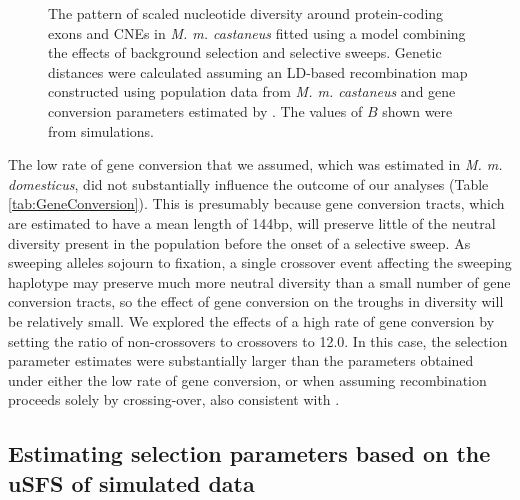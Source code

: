 {\linespread{1}
\begin{figure}[h!]
   \centering      
   \noindent{}
 \caption{The pattern of scaled nucleotide diversity around protein-coding exons and CNEs in \textit{M. m. castaneus} fitted using a model combining the effects of background selection and selective sweeps. Genetic distances were calculated assuming an LD-based recombination map constructed using population data from \textit{M. m. castaneus} and gene conversion parameters estimated by \cite{RN263}. The values of $B$ shown were from simulations.}  

 \label{fig:castaneusFit}
\end{figure}
\linespread{2}		
	The low rate of gene conversion that we assumed, which was estimated in \textit{M. m. domesticus}, did not substantially influence the outcome of our analyses (Table \ref{tab:GeneConversion}). This is presumably because gene conversion tracts, which are estimated to have a mean length of 144bp, will preserve little of the neutral diversity present in the population before the onset of a selective sweep. As sweeping alleles sojourn to fixation, a single crossover event affecting the sweeping haplotype may preserve much more neutral diversity than a small number of gene conversion tracts, so the effect of gene conversion on the troughs in diversity will be relatively small. We explored the effects of a high rate of gene conversion by setting the ratio of non-crossovers to crossovers to 12.0. In this case, the selection parameter estimates were substantially larger than the parameters obtained under either the low rate of gene conversion, or when assuming recombination proceeds solely by crossing-over, also consistent with \cite{RN290}. 
	
\subsection{Estimating selection parameters based on the uSFS of simulated data}

}
